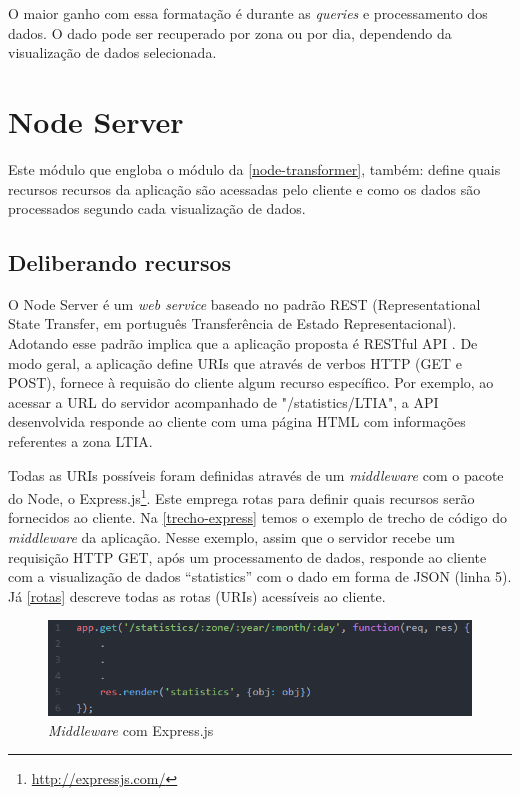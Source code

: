 O maior ganho com essa formatação é durante as \emph{queries} e processamento dos dados. O dado pode ser recuperado
por zona ou por dia, dependendo da visualização de dados selecionada.

\section{Node Server}
\label{node-server}
Este módulo que engloba o módulo da \autoref{node-transformer}, também: define
quais recursos recursos da aplicação são acessadas pelo cliente e como os dados
são processados segundo cada visualização de dados.

\subsection{Deliberando recursos}
O Node Server é um \emph{web service} baseado no padrão REST (Representational
State Transfer, em português Transferência de Estado Representacional). Adotando
esse padrão implica que a aplicação proposta é RESTful API \cite{pires2017}. De
modo geral, a aplicação define URIs que através de verbos HTTP (GET e POST),
fornece à requisão do cliente algum recurso específico. Por exemplo, ao acessar
a URL do servidor acompanhado de "/statistics/LTIA", a API desenvolvida responde
ao cliente com uma página HTML com informações referentes a zona LTIA.

Todas as URIs possíveis foram definidas através de um \emph{middleware} com o
pacote do Node, o Express.js\footnote{\url{http://expressjs.com/}}. Este emprega
rotas para definir quais recursos serão fornecidos ao cliente. Na
\autoref{trecho-express} temos o exemplo de trecho de código do
\emph{middleware} da aplicação. Nesse exemplo, assim que o servidor recebe um
requisição HTTP GET, após um processamento de dados, responde ao cliente com a
visualização de dados ``statistics'' com o dado em forma de JSON (linha 5). Já
\autoref{rotas} descreve todas as rotas (URIs) acessíveis ao cliente.

\begin{figure}[!h]
  \caption{\label{trecho-express}\emph{Middleware} com Express.js}
  \begin{center}
    \includegraphics[width=1.0\textwidth]{img/trecho-express.png}
  \end{center}
\end{figure}

